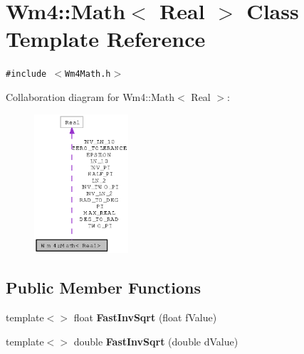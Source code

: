 \section{Wm4::Math$<$ Real $>$ Class Template Reference}
\label{classWm4_1_1Math}
{\tt \#include $<$Wm4Math.h$>$}

Collaboration diagram for Wm4::Math$<$ Real $>$:\begin{figure}[H]
\begin{center}
\leavevmode
\includegraphics[width=99pt]{classWm4_1_1Math__coll__graph}
\end{center}
\end{figure}
\subsection*{Public Member Functions}
\begin{CompactItemize}
\item 
template$<$$>$ float {\bf Fast\-Inv\-Sqrt} (float f\-Value)
\item 
template$<$$>$ double {\bf Fast\-Inv\-Sqrt} (double d\-Value)
\end{CompactItemize}
